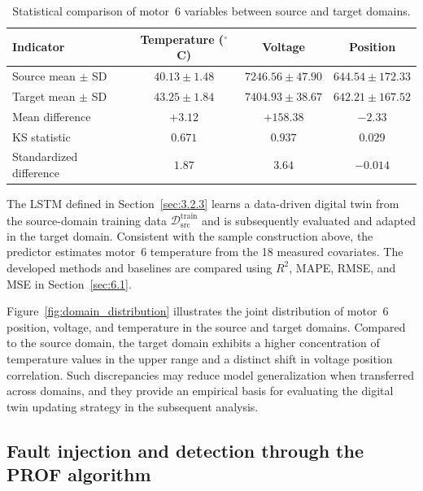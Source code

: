 \documentclass[a4paper,10pt]{cas-sc}%
\newcommand{\rev}[1]{#1}
\begin{document}
\begin{table}[pos=htbp]
	\centering
	
	\caption{Statistical comparison of motor~6 variables between source and target domains.}
	\label{tab:domain_shift}
	\begin{tabular}{lccc}
		\toprule
 \textbf{Indicator} & \textbf{Temperature ($^\circ$C)} & \textbf{Voltage} & \textbf{Position} \\
		\midrule
		Source mean $\pm$ SD & $40.13\pm1.48$          & $7246.56\pm47.90$ & $644.54\pm172.33$ \\
		Target mean $\pm$ SD & $43.25\pm1.84$          & $7404.93\pm38.67$ & $642.21\pm167.52$ \\
		Mean difference & $+3.12$                 & $+158.38$         & $-2.33$           \\
		KS statistic & $0.671$                 & $0.937$           & $0.029$           \\
		Standardized difference & $1.87$                  & $3.64$            & $-0.014$          \\
		\bottomrule
	\end{tabular}
\end{table}

\rev{The LSTM defined in Section~\ref{sec:3.2.3} learns a data-driven digital twin from the source-domain training data $\mathcal{D}_{\text{src}}^{\text{train}}$ and is subsequently evaluated and adapted in the target domain. Consistent with the sample construction above, the predictor estimates motor~6 temperature from the 18 measured covariates. The developed methods and baselines are compared using $R^2$, MAPE, RMSE, and MSE in Section~\ref{sec:6.1}.}

Figure~\ref{fig:domain_distribution} illustrates the joint distribution of motor~6 position, voltage, and temperature in the source and target domains. Compared to the source domain, the target domain exhibits a higher concentration of temperature values in the upper range and a distinct shift in voltage position correlation. Such discrepancies may reduce model generalization when transferred across domains, and they provide an empirical basis for evaluating the digital twin updating strategy in the subsequent analysis.

%
%
\subsection{Fault injection and detection through the PROF algorithm}\label{sec:5.3}
\end{document}
